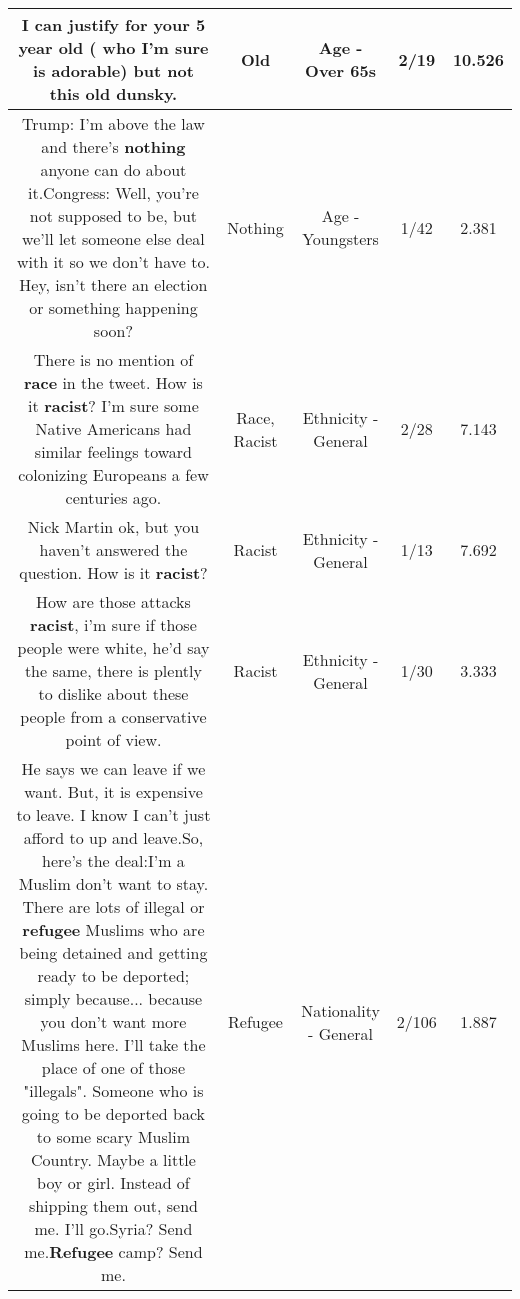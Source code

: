 \documentclass[11pt]{article}
\newlength\mylength
\begin{document}
\begin{center}
\begin{longtable}{|C{.65\mylength}|C{.30\mylength}|C{.12\mylength}|C{.12\mylength}|C{.12\mylength}|}
  \small I can justify for your 5 year \textbf{old} ( who I'm sure is adorable) but not this \textbf{old} dunsky.\normalsize   & Old & Age - Over 65s & 2/19 & 10.526 \\  \hline
  \small Trump:  I'm above the law and there's \textbf{nothing} anyone can do about it.Congress:  Well, you're not supposed to be, but we'll let someone else deal with it so we don't have to.  Hey, isn't there an election or something happening soon?\normalsize   & Nothing & Age - Youngsters & 1/42 & 2.381 \\  \hline
  \small There is no mention of \textbf{race} in the tweet. How is it \textbf{racist}? I'm sure some Native Americans had similar feelings toward colonizing Europeans a few centuries ago.\normalsize   & Race, Racist & Ethnicity - General & 2/28 & 7.143 \\  \hline
  \small Nick Martin ok, but you haven't answered the question. How is it \textbf{racist}?\normalsize   & Racist & Ethnicity - General & 1/13 & 7.692 \\  \hline
  \small How are those attacks \textbf{racist}, i'm  sure if those people were white, he'd say the same, there is plently to dislike about these people from a conservative point of view.\normalsize   & Racist & Ethnicity - General & 1/30 & 3.333 \\  \hline
  \small He says we can leave if we want. But, it is expensive to leave. I know I can't just afford to up and leave.So, here's the deal:I'm a Muslim don't want to stay. There are lots of illegal or \textbf{refugee} Muslims who are being detained and getting ready to be deported; simply because... because you don't want more Muslims here. I'll take the place of one of those "illegals". Someone who is going to be deported back to some scary Muslim Country. Maybe a little boy or girl. Instead of shipping them out, send me. I'll go.Syria? Send me.\textbf{Refugee} camp? Send me.\normalsize   & Refugee & Nationality - General & 2/106 & 1.887 \\  \hline

\end{longtable}
\end{center}
\end{document}
